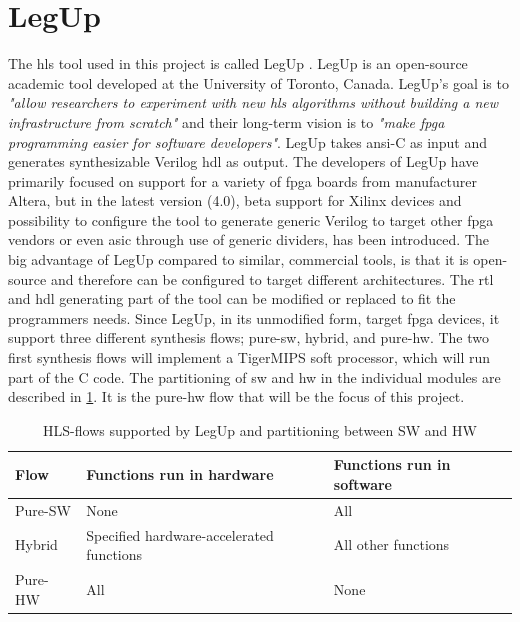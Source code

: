 \section{LegUp}
The \gls{hls} tool used in this project is called LegUp \cite{canis2011legup}. LegUp is an open-source academic tool developed at the University of Toronto, Canada. LegUp's goal is to \textit{"allow researchers to experiment with new \gls{hls} algorithms without building a new infrastructure from scratch"} and their long-term vision is to \textit{"make \gls{fpga} programming easier for software developers"}. LegUp takes \gls{ansi}-C as input and generates synthesizable Verilog \gls{hdl} as output. The developers of LegUp have primarily focused on support for a variety of \gls{fpga} boards from manufacturer Altera, but in the latest version (4.0), beta support for Xilinx devices and possibility to configure the tool to generate generic Verilog to target other \gls{fpga} vendors or even \gls{asic} through use of generic dividers, has been introduced. The big advantage of LegUp compared to similar, commercial tools, is that it is open-source and therefore can be configured to target different architectures. The \gls{rtl} and \gls{hdl} generating part of the tool can be modified or replaced to fit the programmers needs.
Since LegUp, in its unmodified form, target \gls{fpga} devices, it support three different synthesis flows; pure-\gls{sw}, hybrid, and pure-\gls{hw}. The two first synthesis flows will implement a TigerMIPS \cite{tigmips} soft processor, which will run part of the C code. The partitioning of \gls{sw} and \gls{hw} in the individual modules are described in \cref{tab:legupflows}. It is the pure-\gls{hw} flow that will be the focus of this project.

\begin{table}[hbpt]
    \centering
    \caption{\label{tab:legupflows}HLS-flows supported by LegUp and partitioning between SW and HW}
    \begin{tabular}{lp{4.8cm}p{4.8cm}}
      \textbf{Flow} & \textbf{Functions run in hardware} & \textbf{Functions run in software}\\
      \hline
      Pure-SW & None & All \\
      \hline
      Hybrid & Specified hardware-accelerated functions & All other functions \\
      \hline
      Pure-HW & All & None\\
    \end{tabular}
\end{table}

